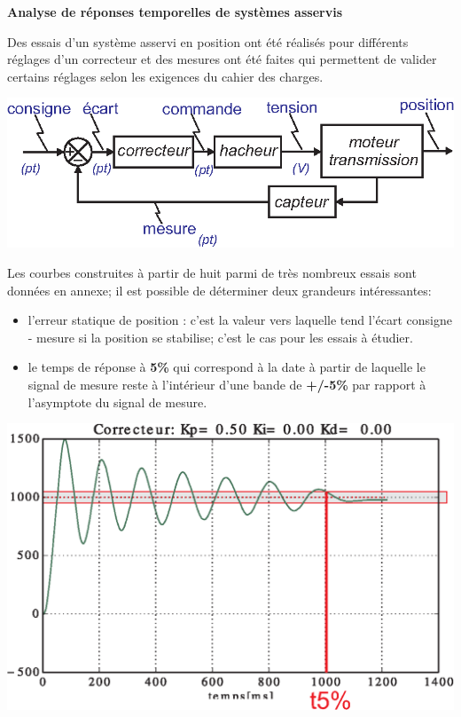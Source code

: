 \documentclass[12pt,a4paper]{article}
\begin{document}
\textbf{Analyse de réponses temporelles de systèmes asservis}

Des essais d'un système asservi en position ont été réalisés pour différents réglages d'un correcteur et des mesures ont été faites qui permettent de valider certains réglages selon les exigences du cahier des charges. 


\begin{center}
\includegraphics[scale=1]{images/schema-bloc.eps} 
\end{center}

Les courbes construites à partir de huit parmi de très nombreux essais sont données en annexe; il est possible de déterminer deux grandeurs intéressantes:
\begin{itemize}
\item l'erreur statique de position : c'est la valeur vers laquelle tend  l'écart  consigne - mesure si la position se stabilise; c'est le cas pour les essais à étudier.
\item le temps de réponse à \textbf{5\%} qui correspond à la date à partir de laquelle le signal de mesure reste à l'intérieur d'une bande de \textbf{+/-5\%} par rapport à l'asymptote du signal de mesure.
\end{itemize}

\begin{center}
\includegraphics[scale=0.8]{images/t5-dessin.eps} 
\end{center}
\end{document}

